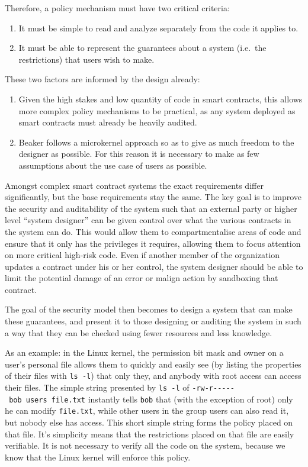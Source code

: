 \documentclass[english,a4paper]{article}
\begin{document}
Therefore, a policy mechanism must have two critical criteria:

\begin{enumerate}
\def\labelenumi{\arabic{enumi}.}
\item
  It must be simple to read and analyze separately from the code it
  applies to.
\item
  It must be able to represent the guarantees about a system (i.e.~the
  restrictions) that users wish to make.
\end{enumerate}

These two factors are informed by the design already:

\begin{enumerate}
\def\labelenumi{\arabic{enumi}.}
\item
  Given the high stakes and low quantity of code in smart contracts,
  this allows more complex policy mechanisms to be practical, as any
  system deployed as smart contracts must already be heavily audited.
\item
  Beaker follows a microkernel approach so as to give as much freedom to
  the designer as possible. For this reason it is necessary to make as
  few assumptions about the use case of users as possible.
\end{enumerate}

Amongst complex smart contract systems the exact requirements differ
significantly, but the base requirements stay the same. The key goal is
to improve the security and auditability of the system such that an
external party or higher level ``system designer'' can be given control
over what the various contracts in the system can do. This would allow
them to compartmentalise areas of code and ensure that it only has the
privileges it requires, allowing them to focus attention on more
critical high-risk code. Even if another member of the organization
updates a contract under his or her control, the system designer should
be able to limit the potential damage of an error or malign action by
sandboxing that contract.

The goal of the security model then becomes to design a system that can
make these guarantees, and present it to those designing or auditing the
system in such a way that they can be checked using fewer resources and
less knowledge.

As an example: in the Linux kernel, the permission bit mask and owner on
a user's personal file allows them to quickly and easily see (by listing
the properties of their files with \texttt{ls\ -l}) that only they, and
anybody with root access can access their files. The simple string
presented by \texttt{ls\ -l} of
\texttt{-rw-r-\/-\/-\/-\/-\ bob\ users\ file.txt} instantly tells
\texttt{bob} that (with the exception of root) only he can modify
\texttt{file.txt}, while other users in the group users can also read
it, but nobody else has access. This short simple string forms the
policy placed on that file. It's simplicity means that the restrictions
placed on that file are easily verifiable. It is not necessary to verify
all the code on the system, because we know that the Linux kernel will
enforce this policy.
\end{document}
